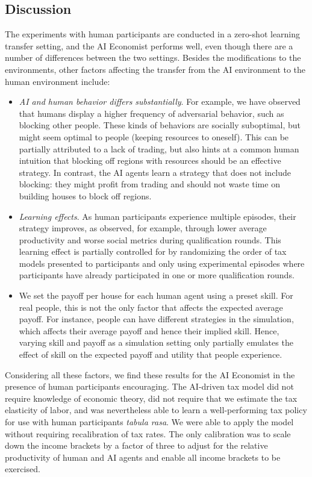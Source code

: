\subsection{Discussion}
The experiments with human participants are conducted in a zero-shot learning transfer setting, and the AI Economist performs well, even though there are a number of differences between the two settings.
Besides the modifications to the environments, other factors affecting the transfer from the AI environment to the human environment include:
\begin{itemize}
\item {\em AI and human behavior differs substantially}. For example, we have observed that humans display a higher frequency of adversarial behavior, such as blocking other people. These kinds of behaviors are socially suboptimal, but might seem optimal to people (keeping resources to oneself).
This can be partially attributed to a lack of trading, but also hints at a common human intuition that blocking off regions with resources should be an effective strategy. In contrast, the AI agents learn a strategy that does not include blocking: they might profit from trading and should not waste time on building houses to block off regions.
\item {\em Learning effects}. As human participants experience multiple episodes, their strategy improves, as observed, for example, through lower average productivity and worse social metrics during qualification rounds.
This learning effect is partially controlled for by randomizing the order of tax models presented to participants
and only using experimental episodes
where participants
have already participated in one or more qualification rounds.
\item We set the payoff per house for each human agent using a preset skill.
For real people, this is not the only factor that affects the expected average payoff. For instance, people can have different strategies in the simulation, which affects their average payoff and hence their implied skill. Hence, varying skill and payoff as a simulation setting only partially emulates the effect of skill on the expected payoff and utility that people experience.
\end{itemize}

Considering all  these factors, we find these results for the AI Economist in the presence of human participants  encouraging. The AI-driven tax model did not require knowledge of economic theory, did not require that we estimate the tax elasticity of labor, and was nevertheless able to learn a well-performing tax policy for use with human participants \emph{tabula rasa}. We were able to apply the model without requiring recalibration of tax rates. The only calibration was to scale down the income brackets by a factor of three to adjust for the relative productivity of human and AI agents and enable all income brackets to be exercised.

